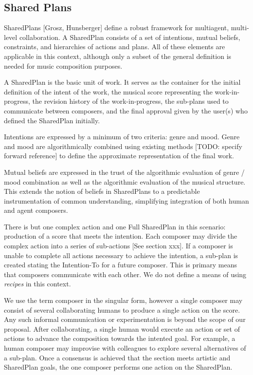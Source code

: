 \documentclass[final,authoryear,5p,times,twocolumn]{elsarticle}
\begin{document}
\subsection{Shared Plans}

SharedPlans [Grosz, Hunsberger] define a robust framework for multiagent, multi-level collaboration. A SharedPlan consists of a set of intentions, mutual beliefs, constraints, and hierarchies of actions and plans. All of these elements are applicable in this context, although only a subset of the general definition is needed for music composition purposes. 

A SharedPlan is the basic unit of work. It serves as the container for the initial definition of the intent of the work, the musical score representing the work-in-progress, the revision history of the work-in-progress, the sub-plans used to communicate between composers, and the final approval given by the user(s) who defined the SharedPlan initially.

Intentions are expressed by a minimum of two criteria: genre and mood. Genre and mood are algorithmically combined using existing methods [TODO: specify forward reference] to define the approximate representation of the final work.
  
Mutual beliefs are expressed in the trust of the algorithmic evaluation of genre / mood combination as well as the algorithmic evaluation of the musical structure. This extends the notion of beliefs in SharedPlans to a predictable instrumentation of common understanding, simplifying integration of both human and agent composers. 

There is but one complex action and one Full SharedPlan in this scenario: production of a score that meets the intention. Each composer may divide the complex action into a series of sub-actions [See section xxx]. If a composer is unable to complete all actions necessary to achieve the intention, a sub-plan is created stating the Intention-To for a future composer. This is primary means that composers communicate with each other. We do not define a means of using \textit{recipes} in this context.

We use the term composer in the singular form, however a single composer may consist of several collaborating humans to produce a single action on the score. Any such informal communication or experimentation is beyond the scope of our proposal. After collaborating, a single human would execute an action or set of actions to advance the composition towards the intented goal. For example, a human composer may improvise with colleagues to explore several alternatives of a sub-plan. Once a consensus is achieved that the section meets artistic and SharedPlan goals, the one composer performs one action on the SharedPlan. 
\end{document}
